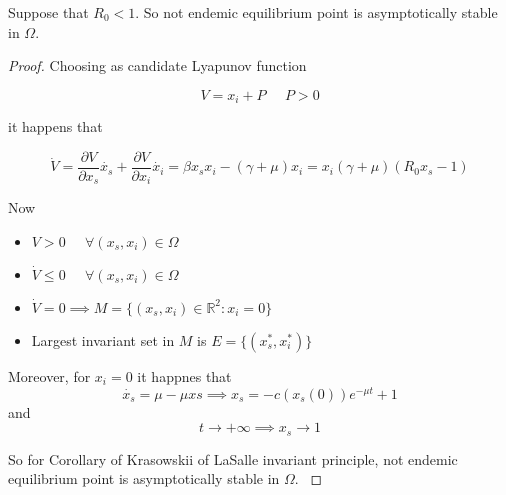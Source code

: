 \begin{theorem}
Suppose that $R_0 < 1$. So not endemic equilibrium point is asymptotically stable in $\Omega$.
\end{theorem}

\begin{proof}
Choosing as candidate Lyapunov function

\begin{equation}
    \label{eq:lyapunov_r0_minor_1}
    V = x_i + P \;\;\;\;\; P > 0
\end{equation}

it happens that

\begin{equation}
    \label{eq:lyapunov_derivative_1_r0_minor_1}
    \dot{V} = \frac{\partial V}{\partial x_s} \dot{x_s} + \frac{\partial V}{\partial x_i} \dot{x_i} = \beta x_sx_i-\left(\gamma+\mu\right)x_i=x_i\left(\gamma+\mu\right)\left(R_0x_s-1\right)
\end{equation}

Now

\begin{itemize}
    \item $V > 0 \;\;\;\;\; \forall \left( x_s, x_i \right) \in \Omega$
    \item $ \dot{V} \leq 0 \;\;\;\;\; \forall \left( x_s, x_i \right) \in \Omega$
    \item $ \dot{V} = 0 \implies M = \{(x_s,x_i) \in \mathbb{R}^2: x_i = 0\}$
    \item Largest invariant set in $M$ is $E = \{(x_s^*,x_i^*)\}$
\end{itemize}

Moreover, for $x_i = 0$ it happnes that
\begin{equation}
    \dot{x_s} = \mu - \mu xs \implies x_s=-c(x_s(0))e^{-\mu t}+1
\end{equation}
and
\begin{equation}
    t \rightarrow +\infty \implies x_s \rightarrow 1
\end{equation}

So for Corollary of Krasowskii of LaSalle invariant principle, not endemic equilibrium point is asymptotically stable in $\Omega$. \cite[p.128]{bib:khalil}
\end{proof}